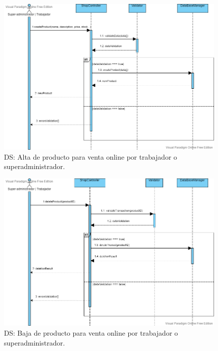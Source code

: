 \begin{figure}[H]
  \centering
  \includegraphics[scale=0.38]{images/Alta_Producto.png}
  \caption{DS: Alta de producto para venta online por trabajador o superadministrador.}
  \label{DS1}
\end{figure}

\begin{figure}[H]
  \centering
  \includegraphics[scale=0.38]{images/Baja_Producto.png}
  \caption{DS: Baja de producto para venta online por trabajador o superadministrador.}
  \label{DS1}
\end{figure}

